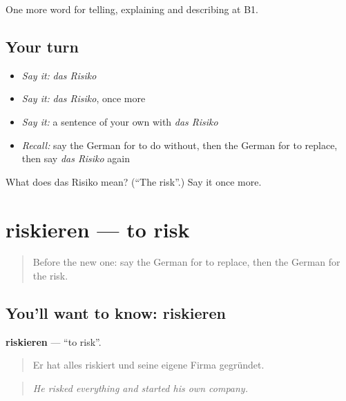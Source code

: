 \begin{grammarlens}[title={What you've built}]
One more word for telling, explaining and describing at B1.
\end{grammarlens}

\subsection*{Your turn}
\begin{itemize}
\raggedright
  \item \emph{Say it:} \emph{das Risiko}
  \item \emph{Say it:} \emph{das Risiko}, once more
  \item \emph{Say it:} a sentence of your own with \emph{das Risiko}
  \item \emph{Recall:} say the German for to do without, then the German for to replace, then say \emph{das Risiko} again
\end{itemize}

\begin{tcolorbox}[breakable,colback=teal!4,colframe=teal!35!black,title={Before you move on}]
What does das Risiko mean? (\textquotedblleft{}The risk\textquotedblright{}.) Say it once more.
\end{tcolorbox}
\section[riskieren]{riskieren — to risk}

\label{lesson:GE-C369-riskieren}



\begin{quote}
Before the new one: say the German for to replace, then the German for the risk.
\end{quote}

\subsection*{You'll want to know: riskieren}
\textbf{riskieren} — \textquotedblleft{}to risk\textquotedblright{}.

\begin{quote}
Er hat alles riskiert und seine eigene Firma gegründet.
\end{quote}

\begin{quote}
\emph{He risked everything and started his own company.}
\end{quote}

